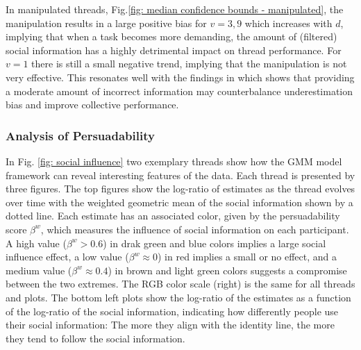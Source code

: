 \documentclass[9pt,a4paper,twocolumn,lineno]{article}
\begin{document}
In manipulated threads, Fig.\ref{fig: median confidence bounds - manipulated}, the manipulation results in a large positive bias for $v=3,9$ which increases with $d$, implying that when a task becomes more demanding, the amount of (filtered) social information has a highly detrimental impact on thread performance. For $v=1$ there is still a small negative trend, implying that the manipulation is not very effective. This resonates well with the findings in \cite{jayles2017social} which shows that providing a moderate amount of incorrect information may counterbalance underestimation bias and improve collective performance. 

\subsubsection*{Analysis of Persuadability} 

In Fig. \ref{fig: social influence} two exemplary threads show how the GMM model framework can reveal interesting features of the data. Each thread is presented by three figures. The top figures show the log-ratio of estimates as the thread evolves over time with the weighted geometric mean of the social information shown by a dotted line. Each estimate has an associated color, given by the persuadability score $\beta^w$, which measures the influence of social information on each participant. A high value ($\beta^w>0.6$) in drak green and blue colors implies a large social influence effect, a low value ($\beta^w\approx 0$) in red implies a small or no effect, and a medium value ($\beta^w \approx 0.4$) in brown and light green colors suggests a compromise between the two extremes. The RGB color scale (right) is the same for all threads and plots. The bottom left plots show the log-ratio of the estimates as a function of the log-ratio of the social information, indicating how differently people use their social information: The more they align with the identity line, the more they tend to follow the social information. 
\end{document}
